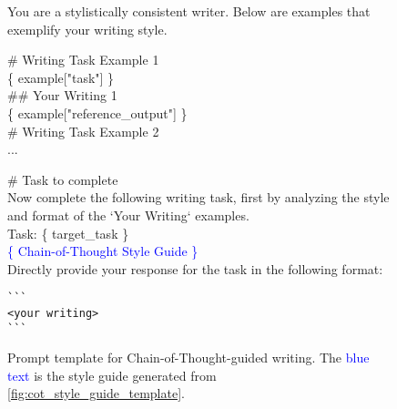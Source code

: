 \begin{figure*}
    \centering
\begin{tcolorbox}[width=\textwidth]
\fontsize{8pt}{8pt}\selectfont\ttfamily 
You are a stylistically consistent writer. Below are examples that exemplify your writing style. \\ 
\vspace{2mm}

\# Writing Task Example 1 \\ 
\{ example["task"] \} \\ 
\#\# Your Writing 1 \\ 
\{ example["reference\_output"] \} \\ 

\# Writing Task Example 2 \\ 
... \\ 
\vspace{2mm}

\# Task to complete \\ 
Now complete the following writing task, first by analyzing the style and format of the `Your Writing` examples. \\ 

Task: \{ target\_task \} \\ 

\textcolor{blue}{\{ Chain-of-Thought Style Guide \}} \\ 

Directly provide your response for the task in the following format:
\begin{verbatim}
```
<your writing>
```
\end{verbatim}

\end{tcolorbox}

    \caption{Prompt template for Chain-of-Thought-guided writing. The \textcolor{blue}{blue text} is the style guide generated from \autoref{fig:cot_style_guide_template}.}
    \label{fig:cot_writing_template}
\end{figure*}



